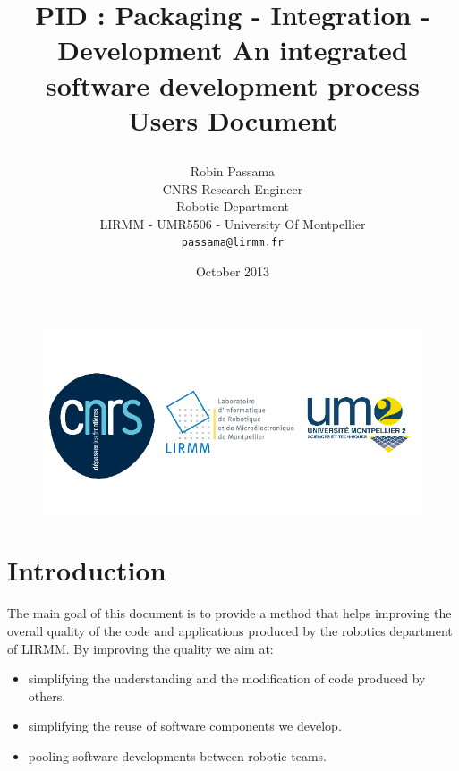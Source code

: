 \documentclass[12pt,a4paper]{article}
\begin{document}
\title{%
    \begin{minipage}\linewidth
        \centering\bfseries\sffamily
        PID : Packaging - Integration - Development 
        \vskip3pt
        \large An integrated software development process
        	\vskip3pt
        	\large Users Document
    \end{minipage}
}

\author{
	Robin Passama\\
	CNRS Research Engineer\\
	Robotic Department\\	
	LIRMM - UMR5506 - University Of Montpellier\\	
	\texttt{passama@lirmm.fr}}
\date{October 2013}

\maketitle

\bigskip
\bigskip
\bigskip
\bigskip
\bigskip
\bigskip

\begin{figure}
\center
\includegraphics[scale=0.7]{images/logos_officiels.png}
\end{figure}


\pagebreak

\part*{Introduction}
The main goal of this document is to provide a method that helps improving the overall quality of the code and applications produced by the robotics department of LIRMM. By improving the quality we aim at:
\begin{itemize}
\item simplifying the understanding and the modification of code produced by others.
\item simplifying the reuse of software components we develop.
\item pooling software developments between robotic teams.
\end{itemize}
\end{document}

